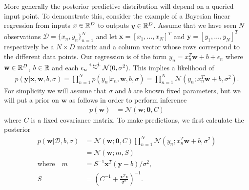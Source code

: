 More generally the posterior predictive distribution will depend on a queried input point.
To demonstrate this, consider the example of a Bayesian linear regression from inputs $x\in\mathbb{R}^D$
to outputs $y\in\mathbb{R}^D$.  Assume that we have seen $N$ observations $\mathcal{D} = \{x_n,y_n\}_{n=1}^N$
and let $\mathbf{x}=[x_1,\dots,x_N]^T$ and $\mathbf{y}=[y_1,\dots,y_N]^T$ respectively be 
a $N\times D$ matrix and a column vector whose rows correspond to the different data points.
Our regression is of the form $y_n= x_n^T\mathbf{w}+b+\epsilon_n$ where $\mathbf{w}\in\mathbb{R}^D$, $b\in\mathbb{R}$
and each $\epsilon_n \overset{i.i.d.}{\sim} \mathcal{N}(0,\sigma^2)$.  This implies a likelihood of
\begin{align}
\label{eq:bayes:linear-reg-lik}
p(\mathbf{y}|\mathbf{x},\mathbf{w},b,\sigma) = \prod_{n=1}^{N} p(y_n | x_n, \mathbf{w}, b, \sigma) = 
\prod_{n=1}^{N} \mathcal{N}(y_n;x_n^T\mathbf{w}+b,\sigma^2).
\end{align}
For simplicity we will assume that $\sigma$ and $b$ are known fixed parameters,
but we will put a prior on $\mathbf{w}$ as follows in order to perform inference
\begin{align}
\label{eq:bayes:linear-reg-w}
p(\mathbf{w}) &= \mathcal{N}(\mathbf{w};\mathbf{0},C)
\end{align}
where $C$ is a fixed covariance matrix.
To make predictions, we first calculate the posterior
\begin{align}
p(\mathbf{w}| \mathcal{D}, b,\sigma) &= \mathcal{N}(\mathbf{w};\mathbf{0},C)
\prod_{n=1}^{N} \mathcal{N}(y_n;x_n^T \mathbf{w}+b,\sigma^2) \nonumber \\
&= \mathcal{N}\left(\mathbf{w} ; m, S\right) \\
\mathrm{where} \quad m &= S^{-1} \mathbf{x}^T \left(\mathbf{y}-b\right)/\sigma^2, \nonumber \\
S &= \left( C^{-1}+\frac{\mathbf{x}^T\mathbf{x}}{\sigma^2}\right)^{-1}. \nonumber
\end{align}
